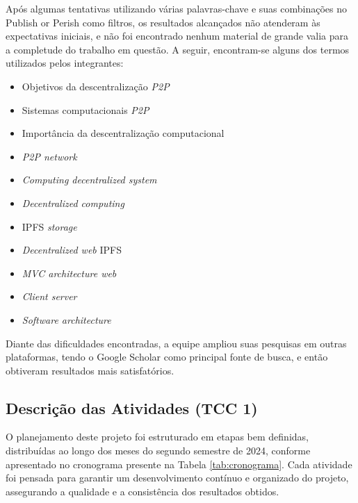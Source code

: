 Após algumas tentativas utilizando várias palavras-chave e suas combinações no Publish or Perish como filtros, os resultados alcançados não atenderam às expectativas iniciais, e não foi encontrado nenhum material de grande valia para a completude do trabalho em questão. A seguir, encontram-se alguns dos termos utilizados pelos integrantes: 

\begin{itemize}
    \item Objetivos da descentralização \textit{P2P}
    \item Sistemas computacionais \textit{P2P}
    \item Importância da descentralização computacional
    \item \textit{P2P network}
    \item \textit{Computing decentralized system}
    \item \textit{Decentralized computing}
    \item IPFS \textit{storage}
    \item \textit{Decentralized web} IPFS
    \item \textit{MVC architecture web}
    \item \textit{Client server}
    \item \textit{Software architecture}
\end{itemize}

Diante das dificuldades encontradas, a equipe ampliou suas pesquisas em outras plataformas, tendo o Google Scholar como principal fonte de busca, e então obtiveram resultados mais satisfatórios. 

\subsection{Descrição das Atividades (TCC 1)}
O planejamento deste projeto foi estruturado em etapas bem definidas, distribuídas ao longo dos meses do segundo semestre de 2024, conforme apresentado no cronograma presente na Tabela \ref{tab:cronograma}. Cada atividade foi pensada para garantir um desenvolvimento contínuo e organizado do projeto, assegurando a qualidade e a consistência dos resultados obtidos.

